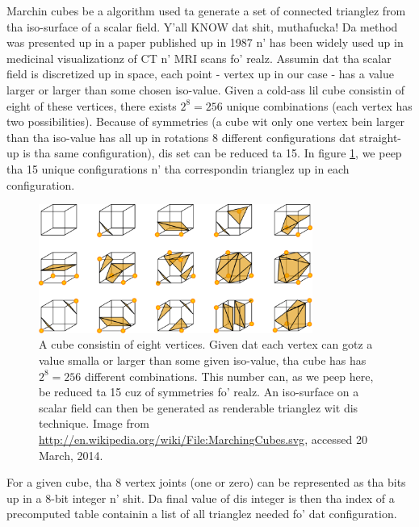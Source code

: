 Marchin cubes be a algorithm used ta generate a set of connected trianglez from tha iso-surface of a scalar field. Y'all KNOW dat shit, muthafucka! Da method was presented up in a paper published up in 1987 n' has been widely used up in medicinal visualizationz of CT n' MRI scans \cite{wiki:marching_cubes} fo' realz. Assumin dat tha scalar field is discretized up in space, each point - vertex up in our case - has a value larger or larger than some chosen iso-value. Given a cold-ass lil cube consistin of eight of these vertices, there exists $2^{8}=256$ unique combinations (each vertex has two possibilities). Because of symmetries (a cube wit only one vertex bein larger than tha iso-value has all up in rotations 8 different configurations dat straight-up is tha same configuration), dis set can be reduced ta 15. In figure \ref{fig:vis_marching_cubes}, we peep tha 15 unique configurations n' tha correspondin trianglez up in each configuration.
\begin{figure}[htb]
\begin{center}
\includegraphics[width=0.8\textwidth, trim=0cm 0cm 0cm 0cm, clip]{visualization/figures/marching_cubes.png}
\end{center}
\caption{A cube consistin of eight vertices. Given dat each vertex can gotz a value smalla or larger than some given iso-value, tha cube has has $2^8=256$ different combinations. This number can, as we peep here, be reduced ta 15 cuz of symmetries fo' realz. An iso-surface on a scalar field can then be generated as renderable trianglez wit dis technique. Image from \url{http://en.wikipedia.org/wiki/File:MarchingCubes.svg}, accessed 20 March, 2014.}
\label{fig:vis_marching_cubes}
\end{figure}
For a given cube, tha 8 vertex joints (one or zero) can be represented as tha bits up in a 8-bit integer n' shit. Da final value of dis integer is then tha index of a precomputed table containin a list of all trianglez needed fo' dat configuration.

